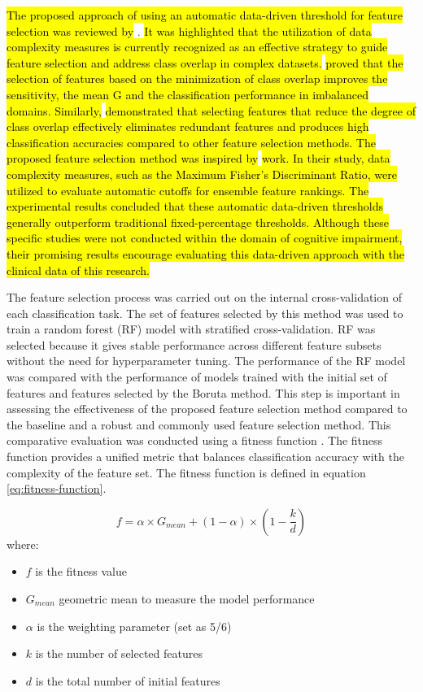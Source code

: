 \hl{The proposed approach of using an automatic data-driven threshold for feature selection was reviewed by} \cite{Santos2023Unifying}. \hl{It was highlighted that the utilization of data complexity measures is currently recognized as an effective strategy to guide feature selection and address class overlap in complex datasets.} \cite{FU2020Feature} \hl{proved that the selection of features based on the minimization of class overlap improves the sensitivity, the mean G and the classification performance in imbalanced domains. Similarly,} \cite{HU2022Attribute} \hl{demonstrated that selecting features that reduce the degree of class overlap effectively eliminates redundant features and produces high classification accuracies compared to other feature selection methods. The proposed feature selection method was inspired by} \cite{Seijo-Pardo2019developing} \hl{work. In their study, data complexity measures, such as the Maximum Fisher's Discriminant Ratio, were utilized to evaluate automatic cutoffs for ensemble feature rankings. The experimental results concluded that these automatic data-driven thresholds generally outperform traditional fixed-percentage thresholds. Although these specific studies were not conducted within the domain of cognitive impairment, their promising results encourage evaluating this data-driven approach with the clinical data of this research.}

The feature selection process was carried out on the internal cross-validation of each classification task. The set of features selected by this method was used to train a random forest (\acrshort{RF}) model with stratified cross-validation. RF was selected because it gives stable performance across different feature subsets without the need for hyperparameter tuning. The performance of the RF model was compared with the performance of models trained with the initial set of features and features selected by the Boruta method. This step is important in assessing the effectiveness of the proposed feature selection method compared to the baseline and a robust and commonly used feature selection method. This comparative evaluation was conducted using a fitness function \cite{Cano2003Using}. The fitness function provides a unified metric that balances classification accuracy with the complexity of the feature set. The fitness function is defined in equation \eqref{eq:fitness-function}.

\begin{equation}
    f = \alpha \times G_{mean} + (1 - \alpha) \times \left(1 - \frac{k}{d}\right)
    \label{eq:fitness-function}
\end{equation}
where:
\begin{itemize}
    \item $f$ is the fitness value
    \item $G_{mean}$ geometric mean to measure the model performance
    \item $\alpha$ is the weighting parameter (set as 5/6)
    \item $k$ is the number of selected features
    \item $d$ is the total number of initial features
\end{itemize}
\vspace{2em}

